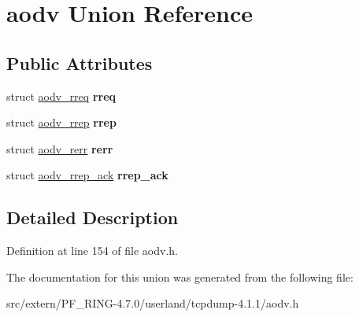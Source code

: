 \hypertarget{unionaodv}{
\section{aodv Union Reference}
\label{unionaodv}
}
\subsection*{Public Attributes}
\begin{DoxyCompactItemize}
\item 
\hypertarget{unionaodv_a91df4117605be9b02b583607283befc5}{
struct \hyperlink{structaodv__rreq}{aodv\_\-rreq} {\bfseries rreq}}
\label{unionaodv_a91df4117605be9b02b583607283befc5}

\item 
\hypertarget{unionaodv_ab433db3b66b22a77c02ba9d49bef442c}{
struct \hyperlink{structaodv__rrep}{aodv\_\-rrep} {\bfseries rrep}}
\label{unionaodv_ab433db3b66b22a77c02ba9d49bef442c}

\item 
\hypertarget{unionaodv_a9564b274e1df1373fbbf4f552f753008}{
struct \hyperlink{structaodv__rerr}{aodv\_\-rerr} {\bfseries rerr}}
\label{unionaodv_a9564b274e1df1373fbbf4f552f753008}

\item 
\hypertarget{unionaodv_a892d313ccb23afdeabc23fbea8d82429}{
struct \hyperlink{structaodv__rrep__ack}{aodv\_\-rrep\_\-ack} {\bfseries rrep\_\-ack}}
\label{unionaodv_a892d313ccb23afdeabc23fbea8d82429}

\end{DoxyCompactItemize}


\subsection{Detailed Description}


Definition at line 154 of file aodv.h.



The documentation for this union was generated from the following file:\begin{DoxyCompactItemize}
\item 
src/extern/PF\_\-RING-\/4.7.0/userland/tcpdump-\/4.1.1/aodv.h\end{DoxyCompactItemize}
